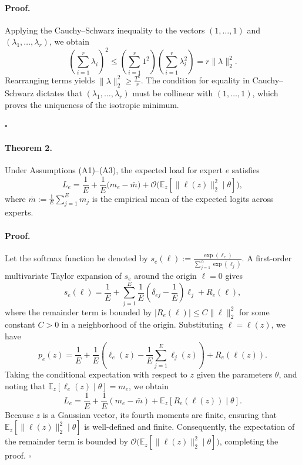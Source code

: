 \documentclass[11pt]{article}
\begin{document}
\paragraph{Proof.}
Applying the Cauchy--Schwarz inequality to the vectors $(1,\dots,1)$ and $(\lambda_1,\dots,\lambda_r)$, we obtain
$$
\left(\sum_{i=1}^r \lambda_i\right)^2
\le \left(\sum_{i=1}^r 1^2\right)\left(\sum_{i=1}^r \lambda_i^2\right)
= r\|\lambda\|_2^2.
$$
Rearranging terms yields $\|\lambda\|_2^2 \ge \frac{T^2}{r}$. The condition for equality in Cauchy--Schwarz dictates that $(\lambda_1,\dots,\lambda_r)$ must be collinear with $(1,\dots,1)$, which proves the uniqueness of the isotropic minimum.

\hfill $\square$

\paragraph{Theorem 2.}
Under Assumptions (A1)--(A3), the expected load for expert $e$ satisfies
$$L_e = \frac{1}{E} + \frac{1}{E}\bigl(m_e-\bar m\bigr) + \mathcal{O}\big(\mathbb{E}_z[\|\ell(z)\|_2^2 \mid \theta]\big),$$
where $\bar m := \frac{1}{E}\sum_{j=1}^E m_j$ is the empirical mean of the expected logits across experts.

\paragraph{Proof.}
Let the softmax function be denoted by $s_e(\ell) := \frac{\exp(\ell_e)}{\sum_{j=1}^E \exp(\ell_j)}$.
A first-order multivariate Taylor expansion of $s_e$ around the origin $\ell=0$ gives
$$
s_e(\ell)
= \frac{1}{E}
+ \sum_{j=1}^E \frac{1}{E}\left(\delta_{ej}-\frac{1}{E}\right)\ell_j
+ R_e(\ell),
$$
where the remainder term is bounded by $|R_e(\ell)| \le C \|\ell\|_2^2$ for some constant $C>0$ in a neighborhood of the origin.
Substituting $\ell = \ell(z)$, we have
$$
p_e(z)
= \frac{1}{E}
+ \frac{1}{E}\left(\ell_e(z)-\frac{1}{E}\sum_{j=1}^E \ell_j(z)\right)
+ R_e(\ell(z)).
$$
Taking the conditional expectation with respect to $z$ given the parameters $\theta$, and noting that $\mathbb{E}_z[\ell_e(z)\mid\theta] = m_e$, we obtain
$$
L_e
= \frac{1}{E}
+ \frac{1}{E}\left(m_e - \bar{m}\right)
+ \mathbb{E}_z[R_e(\ell(z)) \mid \theta].
$$
Because $z$ is a Gaussian vector, its fourth moments are finite, ensuring that $\mathbb{E}_z[\|\ell(z)\|_2^2 \mid \theta]$ is well-defined and finite. Consequently, the expectation of the remainder term is bounded by $\mathcal{O}\big(\mathbb{E}_z[\|\ell(z)\|_2^2 \mid \theta]\big)$, completing the proof.
\hfill $\square$
\end{document}

